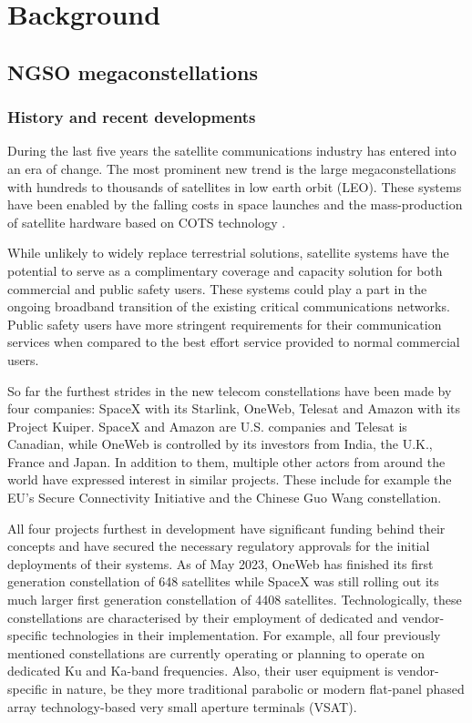 \documentclass[english, 12pt, a4paper, elec, utf8, a-1b, online]{aaltothesis}
\begin{document}
\clearpage

\section{Background}

\subsection{NGSO megaconstellations}
\subsubsection{History and recent developments}
During the last five years the satellite communications industry has entered into an era of change.
The most prominent new trend is the large megaconstellations with hundreds to thousands of satellites in low earth orbit (LEO).
These systems have been enabled by the falling costs in space launches and the mass-production of satellite hardware based on COTS technology \cite{portillo2019technical}.

While unlikely to widely replace terrestrial solutions, satellite systems have the potential to serve as a complimentary coverage and capacity solution for both commercial and public safety users.
These systems could play a part in the ongoing broadband transition of the existing critical communications networks.
Public safety users have more stringent requirements for their communication services when compared to the best effort service provided to normal commercial users.

So far the furthest strides in the new telecom constellations have been made by four companies: SpaceX with its Starlink, OneWeb, Telesat and Amazon with its Project Kuiper.
SpaceX and Amazon are U.S.
companies and Telesat is Canadian, while OneWeb is controlled by its investors from India, the U.K., France and Japan.
In addition to them, multiple other actors from around the world have expressed interest in similar projects.
These include for example the EU’s Secure Connectivity Initiative and the Chinese Guo Wang constellation.

All four projects furthest in development have significant funding behind their concepts and have secured the necessary regulatory approvals for the initial deployments of their systems.
As of May 2023, OneWeb has finished its first generation constellation of 648 satellites while SpaceX was still rolling out its much larger first generation constellation of 4408 satellites.
Technologically, these constellations are characterised by their employment of dedicated and vendor-specific technologies in their implementation.
For example, all four previously mentioned constellations are currently operating or planning to operate on dedicated Ku and Ka-band frequencies.
Also, their user equipment is vendor-specific in nature, be they more traditional parabolic or modern flat-panel phased array technology-based very small aperture terminals (VSAT).
\end{document}
